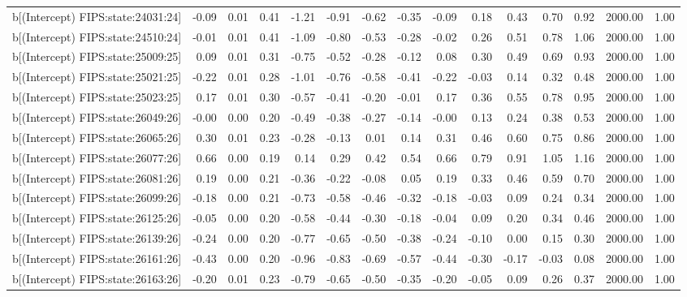 \begin{table}[ht]
\begin{tabular}{rrrrrrrrrrrrrrr}
  b[(Intercept) FIPS:state:24031:24] & -0.09 & 0.01 & 0.41 & -1.21 & -0.91 & -0.62 & -0.35 & -0.09 & 0.18 & 0.43 & 0.70 & 0.92 & 2000.00 & 1.00 \\ 
  b[(Intercept) FIPS:state:24510:24] & -0.01 & 0.01 & 0.41 & -1.09 & -0.80 & -0.53 & -0.28 & -0.02 & 0.26 & 0.51 & 0.78 & 1.06 & 2000.00 & 1.00 \\ 
  b[(Intercept) FIPS:state:25009:25] & 0.09 & 0.01 & 0.31 & -0.75 & -0.52 & -0.28 & -0.12 & 0.08 & 0.30 & 0.49 & 0.69 & 0.93 & 2000.00 & 1.00 \\ 
  b[(Intercept) FIPS:state:25021:25] & -0.22 & 0.01 & 0.28 & -1.01 & -0.76 & -0.58 & -0.41 & -0.22 & -0.03 & 0.14 & 0.32 & 0.48 & 2000.00 & 1.00 \\ 
  b[(Intercept) FIPS:state:25023:25] & 0.17 & 0.01 & 0.30 & -0.57 & -0.41 & -0.20 & -0.01 & 0.17 & 0.36 & 0.55 & 0.78 & 0.95 & 2000.00 & 1.00 \\ 
  b[(Intercept) FIPS:state:26049:26] & -0.00 & 0.00 & 0.20 & -0.49 & -0.38 & -0.27 & -0.14 & -0.00 & 0.13 & 0.24 & 0.38 & 0.53 & 2000.00 & 1.00 \\ 
  b[(Intercept) FIPS:state:26065:26] & 0.30 & 0.01 & 0.23 & -0.28 & -0.13 & 0.01 & 0.14 & 0.31 & 0.46 & 0.60 & 0.75 & 0.86 & 2000.00 & 1.00 \\ 
  b[(Intercept) FIPS:state:26077:26] & 0.66 & 0.00 & 0.19 & 0.14 & 0.29 & 0.42 & 0.54 & 0.66 & 0.79 & 0.91 & 1.05 & 1.16 & 2000.00 & 1.00 \\ 
  b[(Intercept) FIPS:state:26081:26] & 0.19 & 0.00 & 0.21 & -0.36 & -0.22 & -0.08 & 0.05 & 0.19 & 0.33 & 0.46 & 0.59 & 0.70 & 2000.00 & 1.00 \\ 
  b[(Intercept) FIPS:state:26099:26] & -0.18 & 0.00 & 0.21 & -0.73 & -0.58 & -0.46 & -0.32 & -0.18 & -0.03 & 0.09 & 0.24 & 0.34 & 2000.00 & 1.00 \\ 
  b[(Intercept) FIPS:state:26125:26] & -0.05 & 0.00 & 0.20 & -0.58 & -0.44 & -0.30 & -0.18 & -0.04 & 0.09 & 0.20 & 0.34 & 0.46 & 2000.00 & 1.00 \\ 
  b[(Intercept) FIPS:state:26139:26] & -0.24 & 0.00 & 0.20 & -0.77 & -0.65 & -0.50 & -0.38 & -0.24 & -0.10 & 0.00 & 0.15 & 0.30 & 2000.00 & 1.00 \\ 
  b[(Intercept) FIPS:state:26161:26] & -0.43 & 0.00 & 0.20 & -0.96 & -0.83 & -0.69 & -0.57 & -0.44 & -0.30 & -0.17 & -0.03 & 0.08 & 2000.00 & 1.00 \\ 
  b[(Intercept) FIPS:state:26163:26] & -0.20 & 0.01 & 0.23 & -0.79 & -0.65 & -0.50 & -0.35 & -0.20 & -0.05 & 0.09 & 0.26 & 0.37 & 2000.00 & 1.00 \\ 

\end{tabular}
\end{table}
